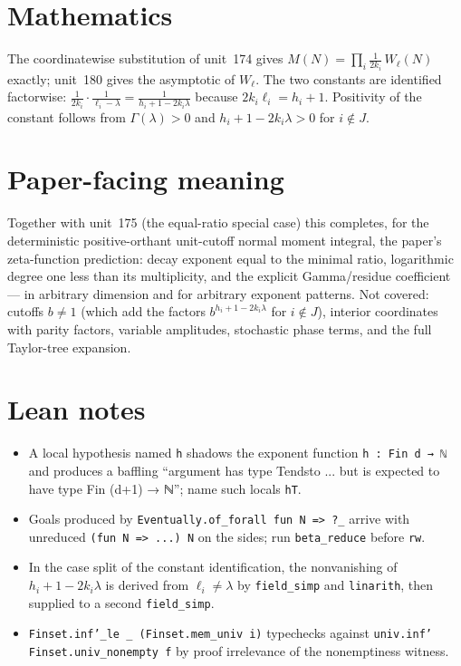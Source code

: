 \documentclass[11pt]{article}
\begin{document}
\section{Mathematics}
The coordinatewise substitution of unit~174 gives $M(N)=\prod_i\frac1{2k_i}\,W_\ell(N)$ exactly;
unit~180 gives the asymptotic of $W_\ell$. The two constants are identified factorwise:
$\frac1{2k_i}\cdot\frac1{\ell_i-\lambda}=\frac1{h_i+1-2k_i\lambda}$ because $2k_i\ell_i=h_i+1$.
Positivity of the constant follows from $\Gamma(\lambda)>0$ and $h_i+1-2k_i\lambda>0$ for
$i\notin J$.

\section{Paper-facing meaning}
Together with unit~175 (the equal-ratio special case) this completes, for the deterministic
positive-orthant unit-cutoff normal moment integral, the paper's zeta-function prediction: decay
exponent equal to the minimal ratio, logarithmic degree one less than its multiplicity, and the
explicit Gamma/residue coefficient --- in arbitrary dimension and for arbitrary exponent patterns.
Not covered: cutoffs $b\neq1$ (which add the factors $b^{h_i+1-2k_i\lambda}$ for $i\notin J$),
interior coordinates with parity factors, variable amplitudes, stochastic phase terms, and the full
Taylor-tree expansion.

\section{Lean notes}
\begin{itemize}
\item A local hypothesis named \texttt{h} shadows the exponent function \texttt{h : Fin d → ℕ} and
produces a baffling ``argument has type Tendsto ... but is expected to have type Fin (d+1) → ℕ'';
name such locals \texttt{hT}.
\item Goals produced by \texttt{Eventually.of\_forall fun N => ?\_} arrive with unreduced
\texttt{(fun N => ...) N} on the sides; run \texttt{beta\_reduce} before \texttt{rw}.
\item In the case split of the constant identification, the nonvanishing of
$h_i+1-2k_i\lambda$ is derived from $\ell_i\neq\lambda$ by \texttt{field\_simp} and
\texttt{linarith}, then supplied to a second \texttt{field\_simp}.
\item \texttt{Finset.inf'\_le \_ (Finset.mem\_univ i)} typechecks against
\texttt{univ.inf' Finset.univ\_nonempty f} by proof irrelevance of the nonemptiness witness.
\end{itemize}
\end{document}

